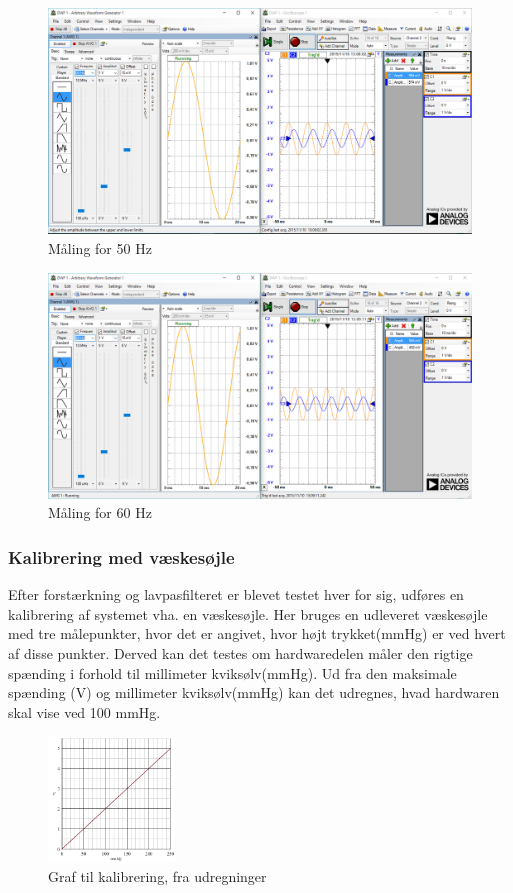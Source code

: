 \begin{figure}[H]
	\centering
	\includegraphics[width=1.0\textwidth]{Figurer/50Hz}
	\caption{Måling for 50 Hz}
	\label{fig:maeling50Hz}
\end{figure}

\begin{figure}[H]
	\centering
	\includegraphics[width=1.0\textwidth]{Figurer/60Hz}
	\caption{Måling for 60 Hz}
	\label{fig:maeling60Hz}
\end{figure}

\subsubsection{Kalibrering med væskesøjle}
Efter forstærkning og lavpasfilteret er blevet testet hver for sig, udføres en kalibrering af systemet vha. en væskesøjle. Her bruges en udleveret væskesøjle med tre målepunkter, hvor det er angivet, hvor højt trykket(mmHg) er ved hvert af disse punkter. Derved kan det testes om hardwaredelen måler den rigtige spænding i forhold til millimeter kviksølv(mmHg). Ud fra den maksimale spænding (V) og millimeter kviksølv(mmHg) kan det udregnes, hvad hardwaren skal vise ved 100 mmHg. 
\begin{figure}[H]
	\centering
	\includegraphics[width=0.3\textwidth]{Figurer/graf_vandtest}
	\caption{Graf til kalibrering, fra udregninger}
	\label{fig:graf_vandtest}
\end{figure}

